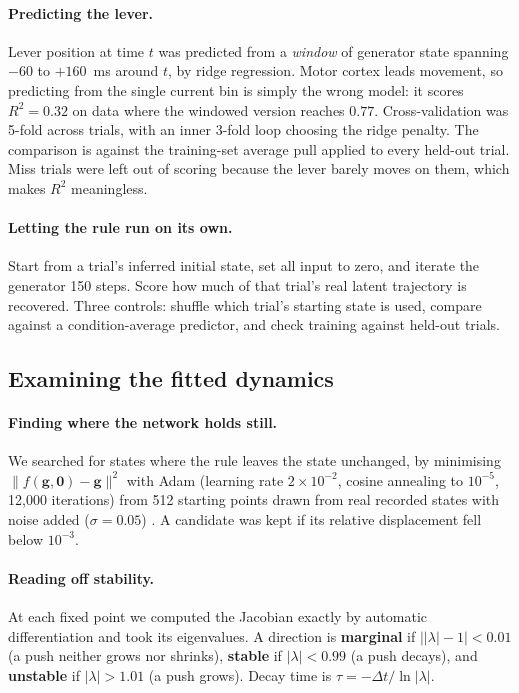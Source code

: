 \documentclass[11pt]{article}
\begin{document}
\paragraph{Predicting the lever.} Lever position at time $t$ was predicted from a
\emph{window} of generator state spanning $-60$ to $+160$~ms around $t$, by ridge
regression. Motor cortex leads movement, so predicting from the single current
bin is simply the wrong model: it scores $R^2 = 0.32$ on data where the windowed
version reaches $0.77$. Cross-validation was 5-fold across trials, with an inner
3-fold loop choosing the ridge penalty. The comparison is against the
training-set average pull applied to every held-out trial. Miss trials were left
out of scoring because the lever barely moves on them, which makes $R^2$
meaningless.

\paragraph{Letting the rule run on its own.} Start from a trial's inferred
initial state, set all input to zero, and iterate the generator 150 steps. Score
how much of that trial's real latent trajectory is recovered. Three controls:
shuffle which trial's starting state is used, compare against a
condition-average predictor, and check training against held-out trials.

\subsection{Examining the fitted dynamics}

\paragraph{Finding where the network holds still.} We searched for states where
the rule leaves the state unchanged, by minimising
$\|f(\mathbf{g},\mathbf{0}) - \mathbf{g}\|^2$ with Adam (learning rate
$2\times10^{-2}$, cosine annealing to $10^{-5}$, 12{,}000 iterations) from 512
starting points drawn from real recorded states with noise added ($\sigma =
0.05$) \cite{sussillo2013,golub2018}. A candidate was kept if its relative
displacement fell below $10^{-3}$.

\paragraph{Reading off stability.} At each fixed point we computed the Jacobian
exactly by automatic differentiation and took its eigenvalues. A direction is
\textbf{marginal} if $\big||\lambda|-1\big| < 0.01$ (a push neither grows nor
shrinks), \textbf{stable} if $|\lambda| < 0.99$ (a push decays), and
\textbf{unstable} if $|\lambda| > 1.01$ (a push grows). Decay time is
$\tau = -\Delta t / \ln|\lambda|$.
\end{document}
